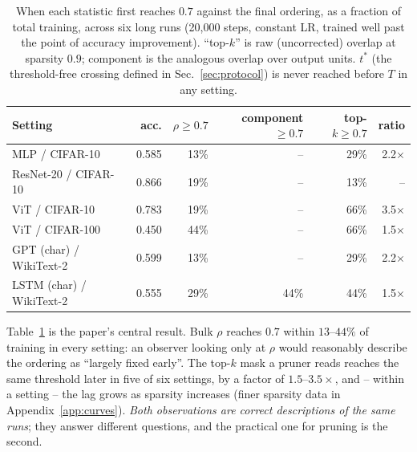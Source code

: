 \documentclass{article}
\begin{document}
\begin{table}[t]
  \caption{When each statistic first reaches $0.7$ against the final ordering, as a
  fraction of total training, across six long runs (20{,}000 steps, constant LR, trained
  well past the point of accuracy improvement). ``top-$k$'' is raw (uncorrected) overlap at
  sparsity $0.9$; component is the analogous overlap over output units. $t^*$ (the
  threshold-free crossing defined in Sec.~\ref{sec:protocol}) is never reached before $T$
  in any setting.}
  \label{tab:main}
  \centering
  \small
  \begin{tabular}{lrrrrr}
    \toprule
    Setting & acc. & $\rho{\ge}0.7$ & component${\ge}0.7$ & top-$k{\ge}0.7$ & ratio \\
    \midrule
    MLP / CIFAR-10            & 0.585 & 13\% & --   & 29\% & 2.2$\times$ \\
    ResNet-20 / CIFAR-10      & 0.866 & 19\% & --   & 13\%\rlap{$^\dagger$} & -- \\
    ViT / CIFAR-10            & 0.783 & 19\% & --   & 66\% & 3.5$\times$ \\
    ViT / CIFAR-100           & 0.450 & 44\% & --   & 66\% & 1.5$\times$ \\
    GPT (char) / WikiText-2   & 0.599 & 13\% & --   & 29\%\rlap{$^\ddagger$} & 2.2$\times$ \\
    LSTM (char) / WikiText-2  & 0.555 & 29\% & 44\% & 44\% & 1.5$\times$ \\
    \bottomrule
  \end{tabular}
\end{table}

Table~\ref{tab:main} is the paper's central result. Bulk $\rho$ reaches $0.7$ within
$13$--$44\%$ of training in every setting: an observer looking only at $\rho$ would
reasonably describe the ordering as ``largely fixed early''. The top-$k$ mask a pruner
reads reaches the same threshold later in five of six settings, by a factor of
$1.5$--$3.5\times$, and -- within a setting -- the lag grows as sparsity increases (finer
sparsity data in Appendix~\ref{app:curves}). \emph{Both observations are correct
descriptions of the same runs}; they answer different questions, and the practical one for
pruning is the second.
\end{document}
